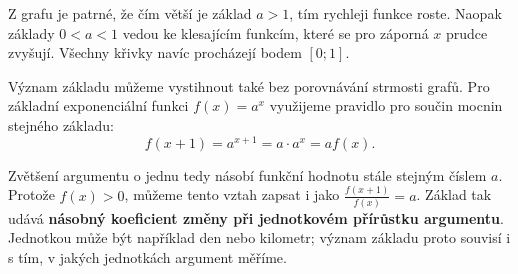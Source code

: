 \documentclass[12pt,a4paper]{article}
\begin{document}
\begin{center}
\end{center}


\begin{notebox}
Z grafu je patrné, že čím větší je základ $a>1$, tím rychleji funkce roste.
Naopak základy $0<a<1$ vedou ke klesajícím funkcím, které se pro záporná $x$
prudce zvyšují. Všechny křivky navíc procházejí bodem $[0;1]$.    
\end{notebox}





\begin{samepage}
Význam základu můžeme vystihnout také bez porovnávání strmosti grafů.
Pro základní exponenciální funkci $f(x)=a^x$ využijeme pravidlo pro součin mocnin stejného základu:
\[
    f(x+1)=a^{x+1}=a\cdot a^x=af(x).
\]
\end{samepage}
Zvětšení argumentu o jednu tedy násobí funkční hodnotu stále stejným číslem $a$.
Protože $f(x)>0$, můžeme tento vztah zapsat i jako $\frac{f(x+1)}{f(x)}=a$.
Základ tak udává \textbf{násobný koeficient změny při jednotkovém přírůstku argumentu}.
Jednotkou může být například den nebo kilometr; význam základu proto souvisí i s tím, v jakých jednotkách argument měříme.
\end{document}

